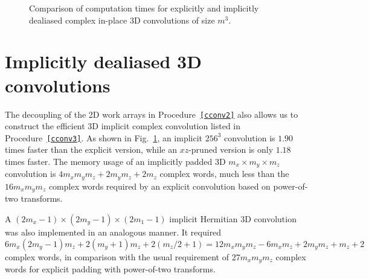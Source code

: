\documentclass[final]{siamltex}
\begin{document}
\begin{figure}[htbp]
\begin{minipage}{0.49\linewidth}
\begin{center}
\caption{Comparison of computation times for explicitly and implicitly
dealiased complex in-place 3D convolutions of size $m^3$.}
\label{timing3c}
\end{center}
\end{minipage}
%
\end{figure}

\section{Implicitly dealiased 3D convolutions}\label{3d}

The decoupling of the 2D work arrays in Procedure~{\tt\ref{cconv2}}
also allows us to construct the efficient 3D implicit complex convolution
listed in Procedure~{\tt\ref{cconv3}}. As shown in Fig.~\ref{timing3c}, an implicit
$256^3$ convolution is $1.90$ times faster than the explicit version, while
an $xz$-pruned version is only $1.18$ times faster. The memory usage of an
implicitly padded 3D $m_x\times m_y\times m_z$ convolution is
$4m_xm_ym_z+2m_y m_z+2m_z$ complex words, much less than the
$16m_xm_ym_z$ complex words required by an explicit 
convolution based on power-of-two transforms.

A $(2m_x-1)\times (2m_y-1)\times (2m_1-1)$ implicit Hermitian 3D
convolution was also implemented in an analogous manner. It required
$$
6m_x(2m_y-1)m_z+2(m_y+1)m_z+2(m_z/2+1)=12m_xm_ym_z-6m_xm_z+2m_ym_z+m_z+2
$$
complex words, in comparison with the usual requirement of $27m_xm_ym_z$
complex words for explicit padding with power-of-two transforms.
\end{document}
